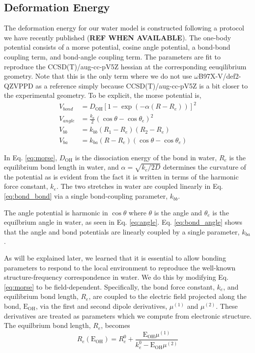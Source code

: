 \documentclass[journal=jacsat,manuscript=article]{achemso}
\begin{document}
\subsection*{Deformation Energy}

The deformation energy for our water model is constructed following a protocol we have
recently published (\textbf{REF WHEN AVAILABLE}). The one-body potential consists of a
morse potential, cosine angle potential, a bond-bond coupling term, and bond-angle coupling
term. The parameters are fit to reproduce the CCSD(T)/aug-cc-pV5Z hessian at the
corresponding eeuqilibrium geometry. Note that this is the only term where we do not
use $\omega$B97X-V/def2-QZVPPD as a reference simply because CCSD(T)/aug-cc-pV5Z is a
bit closer to the experimental geometry. To be explicit, the morse potential is,
\begin{align}
  \label{eq:morse}
  V_{bond}&=D_{\mathrm{OH}}\left[ 1-\exp(-\alpha (R-R_e))\right]^2 \\
  \label{eq:angle}
  V_{angle}&=\frac{k_a}{2}(\cos\theta-\cos\theta_e)^2 \\
  \label{eq:bond_bond}
  V_{bb}&=k_{bb}(R_1-R_e)(R_2-R_e) \\
  \label{eq:bond_angle}
  V_{ba}&=k_{ba}(R-R_e)(\cos\theta-\cos\theta_e)
\end{align}

In Eq. \ref{eq:morse}, $D_{\mathrm{OH}}$ is the dissociation energy of
the  bond in water, $R_e$ is the equilibrium bond length in water,
and $\alpha=\sqrt{k_e/2D}$ determines the curvature of the potential as is
evident from the fact it is written in terms of the harmonic force constant, $k_e$.
The two  stretches in water are coupled linearly in Eq. \ref{eq:bond_bond}
via a single bond-coupling parameter, $k_{bb}$.

The angle potential is harmonic in $\cos\theta$ where $\theta$ is the  angle
and $\theta_e$ is the equilbrium angle in water, as seen in Eq. \ref{eq:angle}.
Eq. \ref{eq:bond_angle} shows that the angle and bond potentials are linearly
coupled by a single parameter, $k_{ba}$.

As will be explained later, we learned that
it is essential to allow bonding parameters to respond to the local environment to reproduce
the well-known structure-frequency correspondence in water.\cite{boyer2019beyond} We do this
by modifying Eq. \ref{eq:morse} to be field-dependent. Specifically, the bond force constant, $k_e$,
and equilibrium bond length, $R_e$, are coupled to the electric field projected along the bond, $\mathrm{E_{OH}}$,
via the first and second dipole derivatives, $\mu^{(1)}$ and $\mu^{(2)}$. These derivatives
are treated as parameters which we compute from electronic structure. The equilbrium bond
length, $R_e$, becomes
\begin{equation}
  R_e(\mathrm{E_{OH}})=R_e^0+ \frac{\mathrm{E_{OH}}\mu^{(1)}}{k_e^0-\mathrm{E_{OH}}\mu^{(2)}}
  \label{eq:bond_in_field}
\end{equation}
\end{document}
